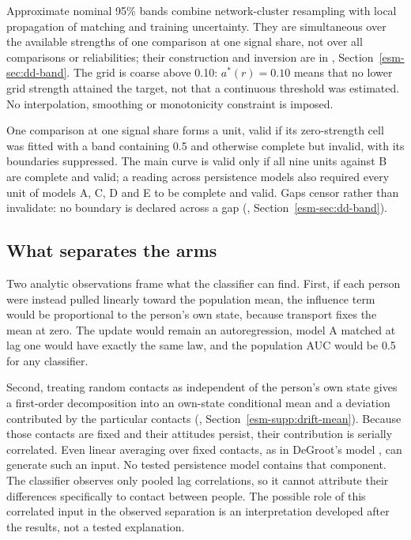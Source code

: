 Approximate nominal 95\% bands combine network-cluster resampling with local propagation of matching and training uncertainty. They are simultaneous over the available strengths of one comparison at one signal share, not over all comparisons or reliabilities; their construction and inversion are in \esmresource, Section~\ref{esm-sec:dd-band}. The grid is coarse above 0.10: $a^*(r)=0.10$ means that no lower grid strength attained the target, not that a continuous threshold was estimated. No interpolation, smoothing or monotonicity constraint is imposed.

One comparison at one signal share forms a unit, valid if its zero-strength cell was fitted with a band containing 0.5 and otherwise complete but invalid, with its boundaries suppressed. The main curve is valid only if all nine units against B are complete and valid; a reading across persistence models also required every unit of models A, C, D and E to be complete and valid. Gaps censor rather than invalidate: no boundary is declared across a gap (\esmresource, Section~\ref{esm-sec:dd-band}).

\subsection{What separates the arms}\label{sec:methods-identification}

Two analytic observations frame what the classifier can find. First, if each person were instead pulled linearly toward the population mean, the influence term would be proportional to the person's own state, because transport fixes the mean at zero. The update would remain an autoregression, model A matched at lag one would have exactly the same law, and the population AUC would be 0.5 for any classifier.

Second, treating random contacts as independent of the person's own state gives a first-order decomposition into an own-state conditional mean and a deviation contributed by the particular contacts (\esmresource, Section~\ref{esm-supp:drift-mean}). Because those contacts are fixed and their attitudes persist, their contribution is serially correlated. Even linear averaging over fixed contacts, as in DeGroot's model \cite{degroot1974}, can generate such an input. No tested persistence model contains that component. The classifier observes only pooled lag correlations, so it cannot attribute their differences specifically to contact between people. The possible role of this correlated input in the observed separation is an interpretation developed after the results, not a tested explanation.

